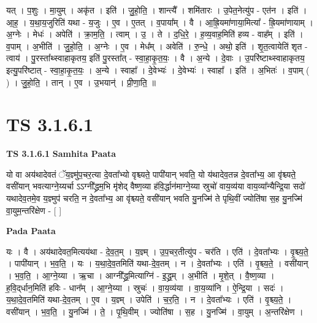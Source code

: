 \documentclass[17pt]{extarticle}
\begin{document}
यत् । प॒शुः । मा॒युम् । अकृ॑त । इति॑ । जु॒हो॒ति॒ । शान्त्यै᳚ । शमि॑तारः । उ॒पेत॒नेत्यु॑प - एत॑न । इति॑ । आ॒ह॒ । य॒था॒य॒जुरिति॑ यथा - य॒जुः । ए॒व । ए॒तत् । व॒पाया᳚म् । वै । आ॒ह्रि॒यमा॑णाया॒मित्या᳚ - ह्रि॒यमा॑णायाम् । अ॒ग्नेः । मेधः॑ । अपेति॑ । क्रा॒म॒ति॒ । त्वाम् । उ॒ । ते । द॒धि॒रे॒ । ह॒व्य॒वाह॒मिति॑ हव्य - वाह᳚म् । इति॑ । व॒पाम् । अ॒भीति॑ । जु॒हो॒ति॒ । अ॒ग्नेः । ए॒व । मेध᳚म् । अवेति॑ । रु॒न्धे॒ । अथो॒ इति॑ । शृ॒त॒त्वायेति॑ शृत - त्वाय॑ । पु॒रस्ता᳚थ्स्वाहाकृतय॒ इति॑ पु॒रस्ता᳚त् - स्वा॒हा॒कृ॒त॒यः॒ । वै । अ॒न्ये । दे॒वाः । उ॒परि॑ष्टाथ्स्वाहाकृतय॒ इत्यु॒परि॑ष्टात् - स्वा॒हा॒कृ॒त॒यः॒ । अ॒न्ये । स्वाहा᳚ । दे॒वेभ्यः॑ । दे॒वेभ्यः॑ । स्वाहा᳚ । इति॑ । अ॒भितः॑ । व॒पाम् ( ) । जु॒हो॒ति॒ । तान् । ए॒व । उ॒भयान्॑ । प्री॒णा॒ति॒ ॥  \newline




\section*{ TS 3.1.6.1 }

\textbf{TS 3.1.6.1 } \newline
\textbf{Samhita Paata} \newline

यो वा अय॑थादेवतं ॅय॒ज्ञ्मु॑प॒चर॒त्या दे॒वता᳚भ्यो वृश्च्यते॒ पापी॑यान् भवति॒ यो य॑थादेव॒तन्न दे॒वता᳚भ्य॒ आ वृ॑श्च्यते॒ वसी॑यान् भवत्याग्ने॒य्यर्चा ऽऽग्नी᳚द्ध्रम॒भि मृ॑शेद् वैष्ण॒व्या ह॑वि॒र्द्धान॑माग्ने॒य्या स्रुचो॑ वाय॒व्य॑या वाय॒व्या᳚न्यैन्द्रि॒या सदो॑ यथादेव॒तमे॒व य॒ज्ञ्मुप॑ चरति॒ न दे॒वता᳚भ्य॒ आ वृ॑श्च्यते॒ वसी॑यान् भवति यु॒नज्मि॑ ते पृथि॒वीं ज्योति॑षा स॒ह यु॒नज्मि॑ वा॒युम॒न्तरि॑क्षेण - [  ] \newline

\textbf{Pada Paata} \newline

यः । वै । अय॑थादेवत॒मित्यय॑था - दे॒व॒त॒म् । य॒ज्ञ्म् । उ॒प॒चर॒तीत्यु॑प - चर॑ति । एति॑ । दे॒वता᳚भ्यः । वृ॒श्च्य॒ते॒ । पापी॑यान् । भ॒व॒ति॒ । यः । य॒था॒दे॒व॒तमिति॑ यथा-दे॒व॒तम् । न । दे॒वता᳚भ्यः । एति॑ । वृ॒श्च्य॒ते॒ । वसी॑यान् । भ॒व॒ति॒ । आ॒ग्ने॒य्या । ऋ॒चा । आग्नी᳚द्ध्र॒मित्याग्नि॑ - इ॒द्ध्र॒म् । अ॒भीति॑ । मृ॒शे॒त् । वै॒ष्ण॒व्या । ह॒वि॒द्‌र्धान॒मिति॑ हविः - धान᳚म् । आ॒ग्ने॒य्या । स्रुचः॑ । वा॒य॒व्य॑या । वा॒य॒व्या॑नि । ऐ॒न्द्रि॒या । सदः॑ । य॒था॒दे॒व॒तमिति॑ यथा-दे॒व॒तम् । ए॒व । य॒ज्ञ्म् । उपेति॑ । च॒र॒ति॒ । न । दे॒वता᳚भ्यः । एति॑ । वृ॒श्च्य॒ते॒ । वसी॑यान् । भ॒व॒ति॒ । यु॒नज्मि॑ । ते॒ । पृ॒थि॒वीम् । ज्योति॑षा । स॒ह । यु॒नज्मि॑ । वा॒युम् । अ॒न्तरि॑क्षेण ।  \newline
\end{document}
